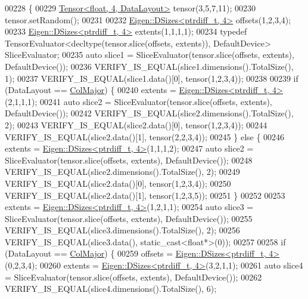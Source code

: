\begin{DoxyCode}
00228 \{
00229   \hyperlink{class_eigen_1_1_tensor}{Tensor<float, 4, DataLayout>} tensor(3,5,7,11);
00230   tensor.setRandom();
00231 
00232   \hyperlink{struct_eigen_1_1_d_sizes}{Eigen::DSizes<ptrdiff\_t, 4>} offsets(1,2,3,4);
00233   \hyperlink{struct_eigen_1_1_d_sizes}{Eigen::DSizes<ptrdiff\_t, 4>} extents(1,1,1,1);
00234   \textcolor{keyword}{typedef} TensorEvaluator<decltype(tensor.slice(offsets, extents)), DefaultDevice> SliceEvaluator;
00235   \textcolor{keyword}{auto} slice1 = SliceEvaluator(tensor.slice(offsets, extents), DefaultDevice());
00236   VERIFY\_IS\_EQUAL(slice1.dimensions().TotalSize(), 1);
00237   VERIFY\_IS\_EQUAL(slice1.data()[0], tensor(1,2,3,4));
00238 
00239   \textcolor{keywordflow}{if} (DataLayout == \hyperlink{group__enums_ggaacded1a18ae58b0f554751f6cdf9eb13a0cbd4bdd0abcfc0224c5fcb5e4f6669a}{ColMajor}) \{
00240     extents = \hyperlink{struct_eigen_1_1_d_sizes}{Eigen::DSizes<ptrdiff\_t, 4>}(2,1,1,1);
00241     \textcolor{keyword}{auto} slice2 = SliceEvaluator(tensor.slice(offsets, extents), DefaultDevice());
00242     VERIFY\_IS\_EQUAL(slice2.dimensions().TotalSize(), 2);
00243     VERIFY\_IS\_EQUAL(slice2.data()[0], tensor(1,2,3,4));
00244     VERIFY\_IS\_EQUAL(slice2.data()[1], tensor(2,2,3,4));
00245   \} \textcolor{keywordflow}{else} \{
00246     extents = \hyperlink{struct_eigen_1_1_d_sizes}{Eigen::DSizes<ptrdiff\_t, 4>}(1,1,1,2);
00247     \textcolor{keyword}{auto} slice2 = SliceEvaluator(tensor.slice(offsets, extents), DefaultDevice());
00248     VERIFY\_IS\_EQUAL(slice2.dimensions().TotalSize(), 2);
00249     VERIFY\_IS\_EQUAL(slice2.data()[0], tensor(1,2,3,4));
00250     VERIFY\_IS\_EQUAL(slice2.data()[1], tensor(1,2,3,5));
00251   \}
00252 
00253   extents = \hyperlink{struct_eigen_1_1_d_sizes}{Eigen::DSizes<ptrdiff\_t, 4>}(1,2,1,1);
00254   \textcolor{keyword}{auto} slice3 = SliceEvaluator(tensor.slice(offsets, extents), DefaultDevice());
00255   VERIFY\_IS\_EQUAL(slice3.dimensions().TotalSize(), 2);
00256   VERIFY\_IS\_EQUAL(slice3.data(), \textcolor{keyword}{static\_cast<}\textcolor{keywordtype}{float}*\textcolor{keyword}{>}(0));
00257 
00258   \textcolor{keywordflow}{if} (DataLayout == \hyperlink{group__enums_ggaacded1a18ae58b0f554751f6cdf9eb13a0cbd4bdd0abcfc0224c5fcb5e4f6669a}{ColMajor}) \{
00259     offsets = \hyperlink{struct_eigen_1_1_d_sizes}{Eigen::DSizes<ptrdiff\_t, 4>}(0,2,3,4);
00260     extents = \hyperlink{struct_eigen_1_1_d_sizes}{Eigen::DSizes<ptrdiff\_t, 4>}(3,2,1,1);
00261     \textcolor{keyword}{auto} slice4 = SliceEvaluator(tensor.slice(offsets, extents), DefaultDevice());
00262     VERIFY\_IS\_EQUAL(slice4.dimensions().TotalSize(), 6);

\end{DoxyCode}
